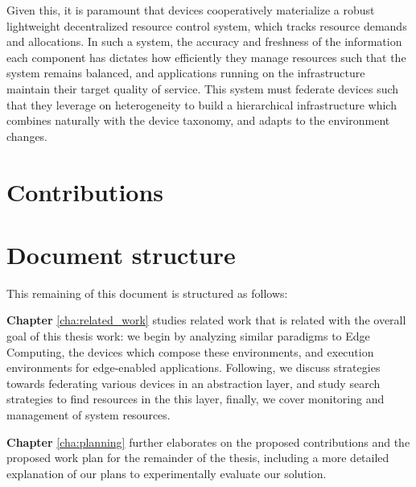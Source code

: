 Given this, it is paramount that devices cooperatively materialize a robust lightweight decentralized resource control system, which tracks resource demands and allocations. In such a system, the accuracy and freshness of the information each component has dictates how efficiently they manage resources such that the system remains balanced, and applications running on the infrastructure maintain their target quality of service. This system must federate devices such that they leverage on heterogeneity to build a hierarchical infrastructure which combines naturally with the device taxonomy, and adapts to the environment changes.

\section{Contributions}

\section{Document structure}

This remaining of this document is structured as follows:

\textbf{Chapter} \ref{cha:related_work} studies related work that is related with the overall goal of this thesis work: we begin by analyzing similar paradigms to Edge Computing, the devices which compose these environments, and execution environments for edge-enabled applications. Following, we discuss strategies towards federating various devices in an abstraction layer, and study search strategies to find resources in the this layer, finally, we cover monitoring and management of system resources.

\textbf{Chapter} \ref{cha:planning} further elaborates on the proposed contributions and the proposed work plan for the remainder of the thesis, including a more detailed explanation of our plans to experimentally evaluate our solution.
